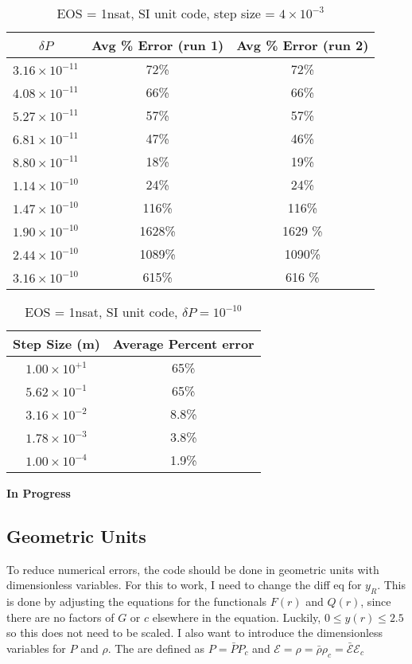 \documentclass[11pt]{article}
\numberwithin{equation}{section}
\begin{document}
\begin{table}[h]
\caption{EOS = 1nsat, SI unit code,  step size = $4 \times 10^{-3}$ }
\centering
\begin{tabular}{|c | c| c|} \hline
$\delta P$ &  Avg \% Error (run 1) &  Avg \% Error (run 2)  \\ \hline
$3.16 \times 10^{-11}$ & 72\%  & 72\% \\
$4.08 \times 10^{-11}$  & 66\% & 66\%  \\
$5.27 \times 10^{-11}$  & 57\% & 57\% \\
$6.81 \times 10^{-11}$  & 47\% & 46\% \\
$8.80 \times 10^{-11}$  & 18\% & 19\%  \\
$1.14 \times 10^{-10}$  & 24\% & 24\%\\
$1.47 \times 10^{-10}$  & 116\% & 116\%\\
$1.90 \times 10^{-10}$  & 1628\% & 1629 \%\\
$2.44 \times 10^{-10}$  & 1089\% &1090\% \\
$3.16 \times 10^{-10}$  & 615\% & 616 \% \\
\hline
\end{tabular}
\end{table}


\begin{table}[h]
\caption{EOS = 1nsat, SI unit code,  $\delta P = 10^{-10}$ }
\centering
\begin{tabular}{|c | c|} \hline
Step Size (m) &  Average Percent error \\ \hline
$1.00  \times 10^{+1}$ & 65\% \\
$5.62 \times 10^{-1}$  & 65\% \\
$3.16 \times 10^{-2}$  & 8.8\% \\
$1.78 \times 10^{-3}$  & 3.8\% \\
$1.00 \times 10^{-4}$  & 1.9\% \\
\hline
\end{tabular}
\end{table}
 
\textbf{In Progress}
\clearpage

\subsection{Geometric Units} 

To reduce numerical errors, the code should be done in geometric units with dimensionless variables.  For this to work, I need to change the diff eq for $y_R$.  This is done by adjusting the equations for the functionals $F(r)$ and $Q(r)$, since there are no factors of $G$ or $c$ elsewhere in the equation.  Luckily, $0 \leq y(r) \leq 2.5$ so this does not need to be scaled.  
I also want to introduce the dimensionless variables for $P$ and $\rho$.  The are defined as $P = \bar{P} P_c$ and $\mathcal{E} = \rho = \bar{\rho} \rho_{c} = \bar{\mathcal{E}} \mathcal{E}_{c}$
\end{document}
